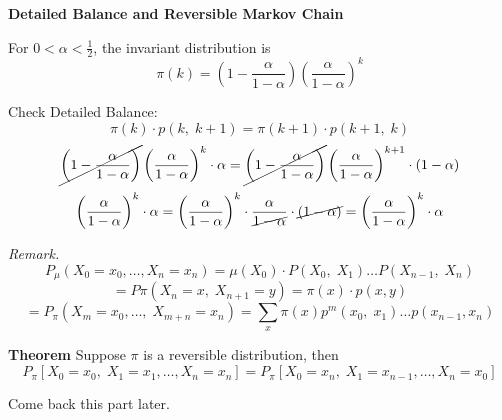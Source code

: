 \documentclass[12pt]{article}
\begin{document}
\begin{section}{\bf Detailed Balance and Reversible Markov Chain}
\begin{enumerate}[label=(\roman*)]
    For $0<\alpha<\frac{1}{2}$, the invariant distribution is
    $$\pi(k)=\left(1-\frac{\alpha}{1-\alpha}\right)\left(\frac{\alpha}{1-\alpha}\right)^k$$
    
    Check Detailed Balance:
    $$\pi(k)\cdot p(k,\;k+1) = \pi(k+1)\cdot p(k+1,\;k)$$
    $$\cancel{\left(1-\frac{\alpha}{1-\alpha}\right)}\left(\frac{\alpha}{1-\alpha}\right)^k\cdot \alpha =
    \cancel{\left(1-\frac{\alpha}{1-\alpha}\right)}\left(\frac{\alpha}{1-\alpha}\right)^{k+1}\cdot (1-\alpha)$$
    $$\left(\frac{\alpha}{1-\alpha}\right)^k\cdot \alpha = \left(\frac{\alpha}{1-\alpha}\right)^{k}\cdot\frac{\alpha}{\cancel{1-\alpha}}\cdot \cancel{(1-\alpha)} = \left(\frac{\alpha}{1-\alpha}\right)^k\cdot \alpha $$
\end{enumerate}


\vspace{2\baselineskip}
{\sl Remark.} 
$$P_\mu(X_0=x_0,\ldots,X_n=x_n)=\mu(X_0)\cdot P(X_0,\;X_1)\ldots P(X_{n-1},\;X_n)$$
$$=P\pi(X_n=x,\;X_{n+1}=y) = \pi(x)\cdot p(x,y)$$
$$=P_\pi(X_m=x_0,\ldots,\; X_{m+n}=x_n) = \sum\limits_x \pi(x)p^m(x_0,\;x_1)\ldots p(x_{n-1},x_n)$$

\vspace{1\baselineskip}
{\bf Theorem} Suppose $\pi$ is a reversible distribution, then
$$P_\pi[X_0=x_0,\; X_1=x_1,\ldots , X_n=x_n] = P_\pi[X_0=x_n,\; X_1=x_{n-1},\ldots, X_n=x_0]$$
\end{section}

Come back this part later.
\end{document}
